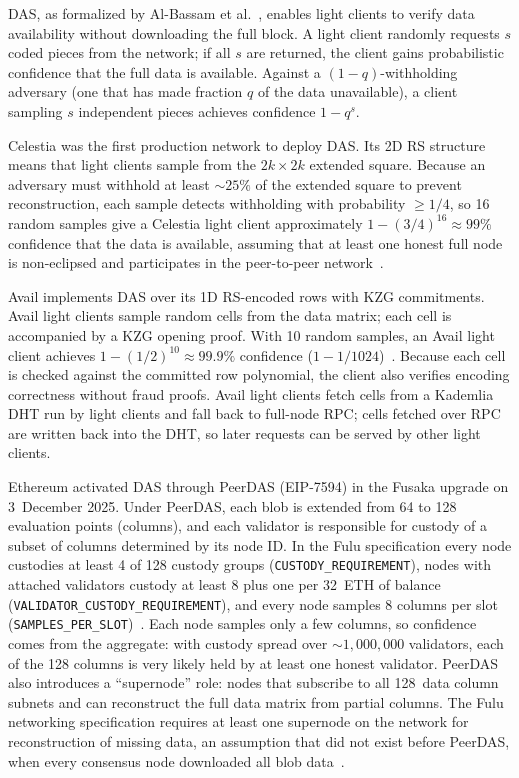DAS, as formalized by Al-Bassam et al.~\cite{AlBassam_FraudDA}, enables light clients to verify data availability without downloading the full block.
A light client randomly requests $s$ coded pieces from the network; if all $s$ are returned, the client gains probabilistic confidence that the full data is available.
Against a $(1{-}q)$-withholding adversary (one that has made fraction $q$ of the data unavailable), a client sampling $s$ independent pieces achieves confidence $1 - q^s$.

Celestia was the first production network to deploy DAS.
Its 2D RS structure means that light clients sample from the $2k \times 2k$ extended square.
Because an adversary must withhold at least ${\sim}25\%$ of the extended square to prevent reconstruction, each sample detects withholding with probability ${\ge}1/4$, so 16 random samples give a Celestia light client approximately $1 - (3/4)^{16} \approx 99\%$ confidence that the data is available, assuming that at least one honest full node is non-eclipsed and participates in the peer-to-peer network~\cite{AlBassam_LazyLedger}.

Avail implements DAS over its 1D RS-encoded rows with KZG commitments.
Avail light clients sample random cells from the data matrix; each cell is accompanied by a KZG opening proof.
With 10 random samples, an Avail light client achieves $1 - (1/2)^{10} \approx 99.9\%$ confidence ($1 - 1/1024$)~\cite{Avail_The_DA_Blockchain}.
Because each cell is checked against the committed row polynomial, the client also verifies encoding correctness without fraud proofs.
Avail light clients fetch cells from a Kademlia DHT run by light clients and fall back to full-node RPC; cells fetched over RPC are written back into the DHT, so later requests can be served by other light clients.

Ethereum activated DAS through PeerDAS (EIP-7594) in the Fusaka upgrade on 3~December 2025.
Under PeerDAS, each blob is extended from 64 to 128 evaluation points (columns), and each validator is responsible for custody of a subset of columns determined by its node ID.
In the Fulu specification every node custodies at least 4 of 128 custody groups (\texttt{CUSTODY\_REQUIREMENT}), nodes with attached validators custody at least 8 plus one per 32~ETH of balance (\texttt{VALIDATOR\_CUSTODY\_REQUIREMENT}), and every node samples 8 columns per slot (\texttt{SAMPLES\_PER\_SLOT})~\cite{EIP-7594}.
Each node samples only a few columns, so confidence comes from the aggregate: with custody spread over ${\sim}1{,}000{,}000$ validators, each of the 128 columns is very likely held by at least one honest validator.
PeerDAS also introduces a ``supernode'' role: nodes that subscribe to all 128~data column subnets and can reconstruct the full data matrix from partial columns. The Fulu networking specification requires at least one supernode on the network for reconstruction of missing data, an assumption that did not exist before PeerDAS, when every consensus node downloaded all blob data~\cite{EIP-7594}.


